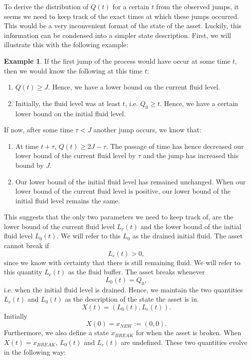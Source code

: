 \documentclass[a4paper]{thesis}
\theoremstyle{definition}
\newtheorem{example}{Example}[chapter]
\begin{document}
To derive the distribution of $Q(t)$ for a certain $t$ from the observed jumps, it seems we need to keep track of the exact times at which these jumps occurred.
This would be a very inconvenient format of the state of the asset.
Luckily, this information can be condensed into a simpler state description.
First, we will illustrate this with the following example:
\begin{example}
	If the first jump of the process would have occur at some time $t$, then we would know the following at this time $t$:
	\begin{enumerate}
		\item $Q(t)\geq J$.
		Hence, we have a lower bound on the current fluid level.
		\item Initially, the fluid level was at least $t$, i.e. $Q_0\geq t$.
		Hence, we have a certain lower bound on the initial fluid level.
	\end{enumerate}
	If now, after some time $\tau<J$ another jump occurs, we know that:
	\begin{enumerate}
		\item At time $t+\tau$, $Q(t)\geq 2J-\tau$.
		The passage of time has hence decreased our lower bound of the current fluid level by $\tau$ and the jump has increased this bound by $J$.
		\item Our lower bound of the initial fluid level has remained unchanged.
		When our lower bound of the current fluid level is positive, our lower bound of the initial fluid level remains the same.
	\end{enumerate}
\end{example}
This suggests that the only two parameters we need to keep track of, are the lower bound of the current fluid level $L_c(t)$ and the lower bound of the initial fluid level $L_0(t)$.
We will refer to this $L_0$ as the drained initial fluid.
The asset cannot break if 
\[L_c(t)>0,\]
since we know with certainty that there is still remaining fluid.
We will refer to this quantity $L_c(t)$ as the fluid buffer.
The asset breaks whenever
\[L_0(t)=Q_0,\]
i.e. when the initial fluid level is drained.
Hence, we maintain the two quantities $L_c(t)$ and $L_0(t)$ as the description of the state the asset is in.
\[
X(t)=(L_0(t),L_c(t)).
\]
Initially
\[
X(0)=x_{NEW}:=(0,0).
\]
Furthermore, we also define a state $x_{BREAK}$ for when the asset is broken.
When $X(t)=x_{BREAK}$, $L_0(t)$ and $L_c(t)$ are undefined.
These two quantities evolve in the following way:
\end{document}
